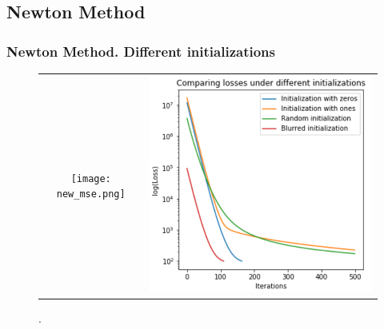 \documentclass[hyperref={pdfpagelabels=false}]{beamer}
\begin{document}
\subsection{Newton Method}
\begin{frame}
\frametitle{Newton Method. Different initializations}

\begin{center}
\begin{figure}[h]
\begin{adjustwidth}{-0.9cm}{-0.9 cm}
\begin{tabular}{cc}
\texttt{[image: new\_mse.png]} &
\includegraphics[scale=0.435]{new_loss.png} 
\end{tabular}
\end{adjustwidth}
\caption{.}
\end{figure}
\end{center}
\end{frame}
\end{document}
